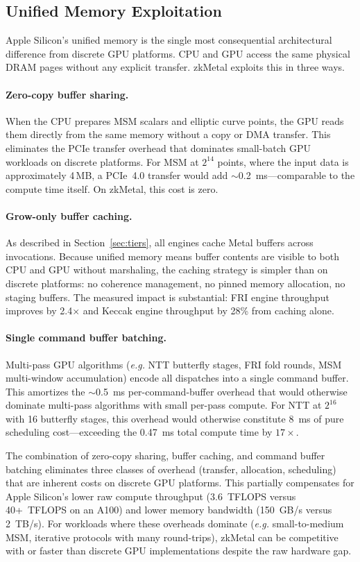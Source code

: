 \documentclass[letterpaper,twocolumn,10pt]{article}
\newcommand{\sys}{zkMetal\xspace}
\newcommand{\eg}{\textit{e.g.}\xspace}
\begin{document}
\subsection{Unified Memory Exploitation}
\label{sec:unified-mem}

Apple Silicon's unified memory is the single most consequential
architectural difference from discrete GPU platforms. CPU and GPU access the
same physical DRAM pages without any explicit transfer. \sys exploits this
in three ways.

\paragraph{Zero-copy buffer sharing.} When the CPU prepares MSM scalars
and elliptic curve points, the GPU reads them directly from the same memory
without a copy or DMA transfer. This eliminates the PCIe transfer overhead
that dominates small-batch GPU workloads on discrete platforms. For MSM at
$2^{14}$ points, where the input data is approximately 4\,MB, a PCIe~4.0
transfer would add ${\sim}$0.2~ms---comparable to the compute time itself.
On \sys, this cost is zero.

\paragraph{Grow-only buffer caching.} As described in
Section~\ref{sec:tiers}, all engines cache Metal buffers across invocations.
Because unified memory means buffer contents are visible to both CPU and
GPU without marshaling, the caching strategy is simpler than on discrete
platforms: no coherence management, no pinned memory allocation, no
staging buffers. The measured impact is substantial: FRI engine throughput
improves by 2.4$\times$ and Keccak engine throughput by 28\% from caching
alone.

\paragraph{Single command buffer batching.} Multi-pass GPU algorithms
(\eg NTT butterfly stages, FRI fold rounds, MSM multi-window accumulation)
encode all dispatches into a single command buffer. This amortizes the
${\sim}$0.5~ms per-command-buffer overhead that would otherwise dominate
multi-pass algorithms with small per-pass compute. For NTT at $2^{16}$ with
16 butterfly stages, this overhead would otherwise constitute 8~ms of
pure scheduling cost---exceeding the 0.47~ms total compute time by
$17\times$.

The combination of zero-copy sharing, buffer caching, and command buffer
batching eliminates three classes of overhead (transfer, allocation,
scheduling) that are inherent costs on discrete GPU platforms. This
partially compensates for Apple Silicon's lower raw compute throughput
(3.6~TFLOPS versus 40+~TFLOPS on an A100) and lower memory bandwidth
(150~GB/s versus 2~TB/s). For workloads where these overheads dominate
(\eg small-to-medium MSM, iterative protocols with many round-trips), \sys
can be competitive with or faster than discrete GPU implementations
despite the raw hardware gap.



\end{document}

